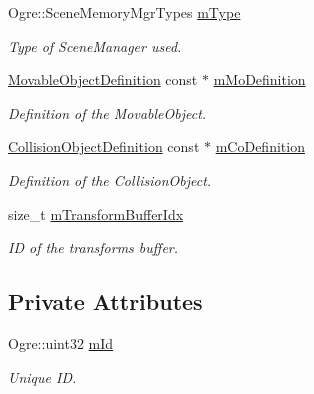 \begin{DoxyCompactItemize}
\mbox{\label{struct_common_1_1_game_entity_a8d91c6cbb06d2c46d2b07b1461b62371}} 
Ogre\+::\+Scene\+Memory\+Mgr\+Types \hyperlink{struct_common_1_1_game_entity_a8d91c6cbb06d2c46d2b07b1461b62371}{m\+Type}
\begin{DoxyCompactList}\small\item\em Type of Scene\+Manager used. \end{DoxyCompactList}\item 
\mbox{\label{struct_common_1_1_game_entity_a7e663e00167ef9bf306c474988c949cd}} 
\hyperlink{struct_common_1_1_movable_object_definition}{Movable\+Object\+Definition} const  $\ast$ \hyperlink{struct_common_1_1_game_entity_a7e663e00167ef9bf306c474988c949cd}{m\+Mo\+Definition}
\begin{DoxyCompactList}\small\item\em Definition of the Movable\+Object. \end{DoxyCompactList}\item 
\mbox{\label{struct_common_1_1_game_entity_a87c7617ad8a3dcdd6dd424cca9fb1079}} 
\hyperlink{struct_common_1_1_collision_object_definition}{Collision\+Object\+Definition} const  $\ast$ \hyperlink{struct_common_1_1_game_entity_a87c7617ad8a3dcdd6dd424cca9fb1079}{m\+Co\+Definition}
\begin{DoxyCompactList}\small\item\em Definition of the Collision\+Object. \end{DoxyCompactList}\item 
\mbox{\label{struct_common_1_1_game_entity_a52127ea487808c64d5e974d2fefcd49b}} 
size\+\_\+t \hyperlink{struct_common_1_1_game_entity_a52127ea487808c64d5e974d2fefcd49b}{m\+Transform\+Buffer\+Idx}
\begin{DoxyCompactList}\small\item\em ID of the transform\textquotesingle{}s buffer. \end{DoxyCompactList}\end{DoxyCompactItemize}
\subsection*{Private Attributes}
\begin{DoxyCompactItemize}
\item 
\mbox{\label{struct_common_1_1_game_entity_aade9d274728bf5ed3625fde35d2fd4e7}} 
Ogre\+::uint32 \hyperlink{struct_common_1_1_game_entity_aade9d274728bf5ed3625fde35d2fd4e7}{m\+Id}
\begin{DoxyCompactList}\small\item\em Unique ID. \end{DoxyCompactList}\end{DoxyCompactItemize}


